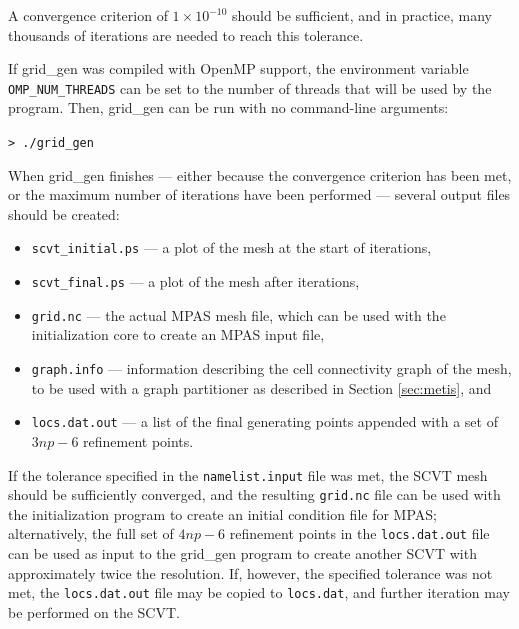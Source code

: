 \documentclass[11pt]{report}
\begin{document}
\noindent A convergence criterion of $1\times10^{-10}$ should be sufficient, and in                     
practice, many thousands of iterations are needed to reach this tolerance.

If grid\_gen was compiled with OpenMP support, the environment variable {\tt OMP\_NUM\_THREADS} can be set to the 
number of threads that will be used by the program. Then, grid\_gen can be run with no command-line arguments:

\vspace{12pt}
{\tt > ./grid\_gen}
\vspace{12pt}
                                                                                         
                                                                                                
When grid\_gen finishes --- either because the convergence criterion has been met, or the
maximum number of iterations have been performed ---  several output files should be created: 

\begin{itemize}
\item {\tt scvt\_initial.ps} --- a plot of the mesh at the start of iterations,
\item {\tt scvt\_final.ps} --- a plot of the mesh after iterations,
\item {\tt grid.nc} --- the actual MPAS mesh file, which can be used with the initialization core to create an MPAS input file,
\item {\tt graph.info} --- information describing the cell connectivity graph of the mesh, to be used with a graph partitioner as described in Section \ref{sec:metis}, and
\item {\tt locs.dat.out} --- a list of the final generating points appended with a set of $3 np - 6$ refinement points. 
\end{itemize}

If the tolerance specified in the {\tt namelist.input} file was met, the SCVT mesh should be sufficiently converged, and the resulting {\tt grid.nc}
file can be used with the initialization program to create an initial condition file for MPAS; alternatively, the full set of $4 np - 6$ refinement points in 
the {\tt locs.dat.out} file can be used as input to the grid\_gen program to create another SCVT with approximately twice the resolution. If, however, the specified tolerance was not met, the {\tt locs.dat.out} file may be copied to {\tt locs.dat}, and further iteration may be performed on the SCVT.
\end{document}

